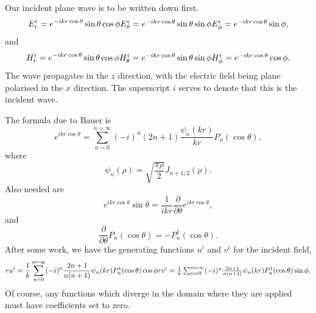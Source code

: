Our incident plane wave is to be written down first.
\begin{equation}
E^i_r=e^{-ikr \cos \theta} \sin \theta \cos \phi
$$    $$
E^i_\theta=e^{-ikr \cos \theta} \sin \theta \sin \phi
$$    $$
E^i_\phi=e^{-ikr \cos \theta}  \sin \phi,
\end{equation}
and 
\begin{equation}
H^i_r=e^{-ikr \cos \theta} \sin \theta \cos \phi
$$    $$
H^i_\theta=e^{-ikr \cos \theta} \sin \theta \sin \phi
$$    $$
H^i_\phi=e^{-ikr \cos \theta}  \cos \phi.
\end{equation}
The wave propagates in the $z$ direction, with the electric field being plane polarised in the $x$ direction.  The superscript $i$ serves to denote that this is the incident wave.

The formula due to Bauer is
\begin{equation}
e^{ikr \cos \theta}=\sum_{n=0}^{n=\infty} (-i)^n (2n+1) 
\frac{\psi_n(k r)}{kr} P_n(\cos \theta),
\end{equation}
where
\begin{equation}
\psi_n(\rho)= \sqrt{ \frac{\pi \rho}{2}} J_{n+1/2}(\rho).
\end{equation}
Also needed are
\begin{equation}
e^{i kr \cos \theta} \sin \theta
=\frac{1}{ikr} \frac{\partial}{\partial \theta} e^{i kr \cos \theta},
\end{equation}
and
\begin{equation}
\frac{\partial}{\partial \theta} P_n(\cos \theta)=-P^1_n(\cos \theta).
\end{equation}
After some work, we have the generating functions $u^i$ and $v^i$
 for the incident field, 
\begin{equation}
ru^i= \frac{1}{k} \sum_{n=0}^{n=\infty} (-i)^n
\frac{ 2n+1}{n(n+1)} \psi_n (k r) P^1_n(\cos \theta) \cos \phi
$$    $$
rv^i= \frac{1}{k} \sum_{n=0}^{n=\infty} (-i)^n
\frac{ 2n+1}{n(n+1)} \psi_n (k r) P^1_n(\cos \theta) \sin \phi.
\end{equation}
Of course, any functions which diverge  in the domain where they are applied 
must have coefficients set to zero.

